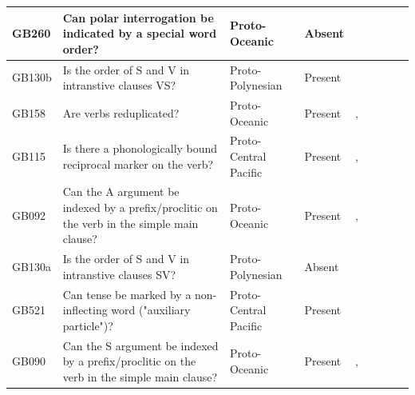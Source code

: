 \documentclass[draft,10pt]{article} %
\begin{document}
\begin{landscape}
\begin{longtable}{| p{2cm}| p{3cm}| p{2.5cm}|p{2cm}|p{2cm}|p{2cm}|p{2cm}|p{2cm}|p{2cm}|}
GB260&Can polar interrogation be indicated by a special word order?&Proto-Oceanic&Absent&\citet[89]{lynchrosscrowley_proto_grammar_oceanic}& \cellcolor{hedvig_lightgreen!50}{True Negative} & \cellcolor{hedvig_yellow!50}{Half} & \cellcolor{hedvig_yellow!50}{True Negative} & \cellcolor{hedvig_yellow!50}{True Negative} \\ \hline
GB130b&Is the order of S and V in intranstive clauses VS?&Proto-Polynesian&Present&\citet[122]{kikusawa2002proto}& \cellcolor{hedvig_yellow!50}{Half} & \cellcolor{hedvig_yellow!50}{Half} & \cellcolor{hedvig_lightgreen!50}{True Positive} & \cellcolor{hedvig_lightgreen!50}{True Positive} \\ \hline
GB158&Are verbs reduplicated?&Proto-Oceanic&Present&\citet[84]{lynchrosscrowley_proto_grammar_oceanic}, \citet[112]{evans2003study}& \cellcolor{hedvig_yellow!50}{Half} & \cellcolor{hedvig_yellow!50}{Half} & \cellcolor{hedvig_lightgreen!50}{True Positive} & \cellcolor{hedvig_lightgreen!50}{True Positive} \\ \hline
GB115&Is there a phonologically bound reciprocal marker on the verb?&Proto-Central Pacific&Present&\citet[352]{pawley1970change}, \citet[83]{lynchrosscrowley_proto_grammar_oceanic}& \cellcolor{hedvig_lightgreen!50}{True Positive} & \cellcolor{hedvig_yellow!50}{Half} & \cellcolor{hedvig_lightgreen!50}{True Positive} & \cellcolor{hedvig_yellow!50}{Half} \\ \hline
GB092&Can the A argument be indexed by a prefix/proclitic on the verb in the simple main clause?&Proto-Oceanic&Present&\citet[498-499]{ross2004morphosyntactic}, \citet[83]{lynchrosscrowley_proto_grammar_oceanic}& \cellcolor{hedvig_yellow!50}{Half} & \cellcolor{hedvig_yellow!50}{Half} & \cellcolor{hedvig_lightgreen!50}{True Positive} & \cellcolor{hedvig_lightgreen!50}{True Positive} \\ \hline
GB130a&Is the order of S and V in intranstive clauses SV?&Proto-Polynesian&Absent&\citet[122]{kikusawa2002proto}& \cellcolor{hedvig_yellow!50}{Half} & \cellcolor{hedvig_yellow!50}{Half} & \cellcolor{hedvig_yellow!50}{True Negative} & \cellcolor{hedvig_yellow!50}{True Negative} \\ \hline
GB521&Can tense be marked by a non-inflecting word ("auxiliary particle")?&Proto-Central Pacific&Present&\citet[347]{pawley1970change}& \cellcolor{hedvig_lightgreen!50}{True Positive} & \cellcolor{hedvig_yellow!50}{Half} & \cellcolor{hedvig_lightgreen!50}{True Positive} & \cellcolor{hedvig_yellow!50}{Half} \\ \hline
GB090&Can the S argument be indexed by a prefix/proclitic on the verb in the simple main clause?&Proto-Oceanic&Present&\citet[498-499]{ross2004morphosyntactic}, \citet[83]{lynchrosscrowley_proto_grammar_oceanic}& \cellcolor{hedvig_yellow!50}{Half} & \cellcolor{hedvig_yellow!50}{Half} & \cellcolor{hedvig_lightgreen!50}{True Positive} & \cellcolor{hedvig_lightgreen!50}{True Positive} \\ \hline

\end{longtable}
\end{landscape}
\end{document}
